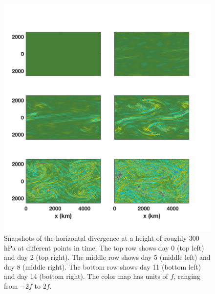 \begin{figure}[H]
\vspace{-3em}
\includegraphics[scale=1]{Chapter3/img/div}
\caption{Snapshots of the horizontal divergence at a height of roughly 300 hPa at different points in time. The top row shows day 0 (top left) and day 2 (top right). The middle row shows day 5 (middle left) and day 8 (middle right). The bottom row shows day 11 (bottom left) and day 14 (bottom right). The color map has units of $f$, ranging from $-2f$ to $2f$.}
\label{fig:div}
\end{figure}

